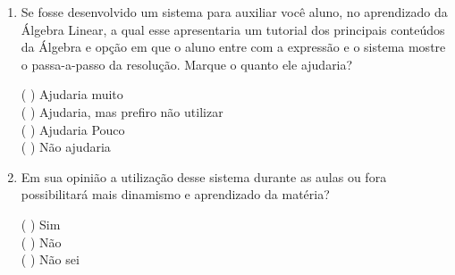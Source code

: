 \begin{enumerate}
\_\_\_\_\_\_\_\_\_\_\_\_\_\_\_\_\_\_\_\_\_\_\_\_\_\_\_\_\_\_\_\_\_\_\_\_\_\_\_\_\_\_\_\_\_\_\_\_\_\_\_\_\_\_\_\_\_\_\_\_\_\_\_\_\_\_\_\_\_\_\_\_\_\_\_\_\_\_\_\_\_\_\_\_\_\_\_\_\_\_\_\_\_\_\_\_\_\_\_\_\_\_\_\_\_\_\_\_\_\_\_\_\_\_\_\_\_\_\_\_\_\_\_\_\_\_\_\_\_\_\_\_\_\_\_\_\_\_\_\_\_\_\_\_\_\_\_\_\_\_\_\_\_\_\_\_\_\_\_\_\_\_\_\_\_\_\_\_\_\_\_\_\_\_\_\_

\item Se fosse desenvolvido um sistema para auxiliar você aluno, no aprendizado da Álgebra Linear, a qual esse apresentaria um tutorial dos principais conteúdos da Álgebra e opção em que o aluno entre com a expressão e o sistema mostre o passa-a-passo da resolução. Marque o quanto ele ajudaria?

(   ) Ajudaria muito\\
(   ) Ajudaria, mas prefiro não utilizar\\
(   ) Ajudaria Pouco\\
(   ) Não ajudaria 

\item Em sua opinião a utilização desse sistema durante as aulas ou fora possibilitará mais dinamismo e aprendizado da matéria?

(   ) Sim\\
(   ) Não\\
(   ) Não sei

\end{enumerate}




